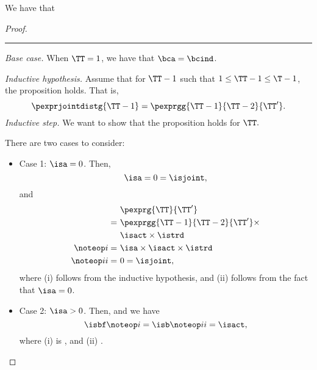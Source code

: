 \begin{proposition}
  We have that %
\end{proposition}

\begin{proof}
  \hrule
  {\it Base case.}
  When $\TT = 1$,
  we have  that
  $\bca = \bcind$.

  \srule
  {\it Inductive hypothesis.}
  Assume that for $\TT - 1$ such that $1 \le \TT - 1 \le \T - 1$,
  the proposition holds. That is,
  $$ \pexprjointdistg{\TT - 1} = \pexprgg{\TT - 1}{\TT - 2}{\TT'}.$$%
  \srule
  {\it Inductive step.}
  We want to show that the proposition holds for $\TT.$

  There are two cases to consider:
  \begin{itemize}
    \item Case 1: $\isa = 0$. 
      Then,
      $$\isa = 0 = \isjoint,$$
      and
      \begin{align*}
      &\pexprg{\TT}{\TT'} \\
      =\ &\pexprgg{\TT - 1}{\TT - 2}{\TT'} \times \\
      &\isact \times \istrd\\
      \noteop i = \ & \isa \times \isact \times \istrd \\
      \noteop ii = \ & 0 = \isjoint,
      \end{align*}
      where (i) follows from the inductive hypothesis,
      and (ii) follows from the fact that $\isa = 0$.
    \item Case 2: $\isa > 0$. 
      Then, 
      and we have
      $$\isbf \noteop i = \isb \noteop ii = \isact,$$
      where (i) is , and (ii) .


\end{itemize}
\end{proof}
